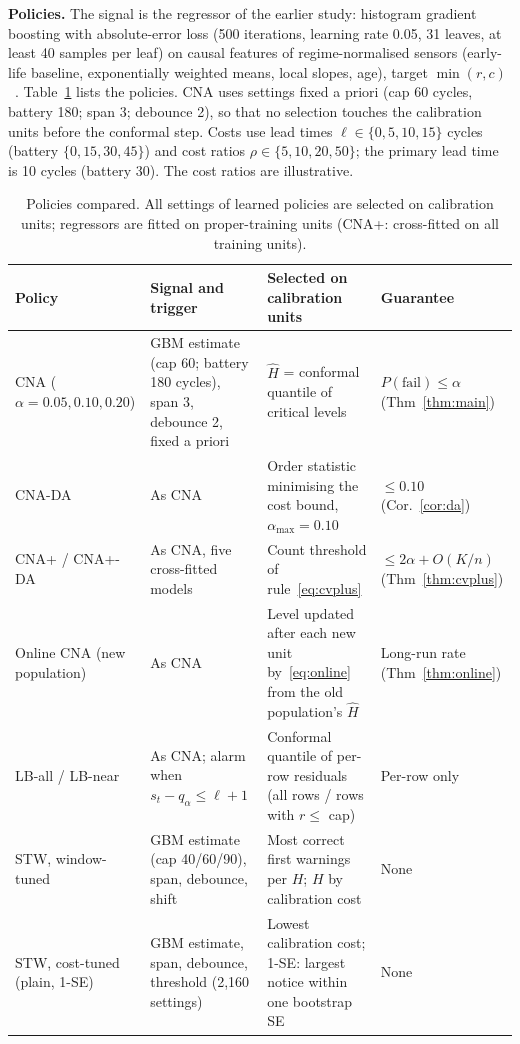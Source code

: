 \textbf{Policies.} The signal is the regressor of the earlier study: histogram gradient boosting with absolute-error loss (500 iterations, learning rate 0.05, 31 leaves, at least 40 samples per leaf) on causal features of regime-normalised sensors (early-life baseline, exponentially weighted means, local slopes, age), target $\min(r,c)$~\cite{pedregosa2011}. Table~\ref{tab:policies} lists the policies. CNA uses settings fixed a priori (cap 60 cycles, battery 180; span 3; debounce 2), so that no selection touches the calibration units before the conformal step. Costs use lead times $\ell\in\{0,5,10,15\}$ cycles (battery $\{0,15,30,45\}$) and cost ratios $\rho\in\{5,10,20,50\}$; the primary lead time is 10 cycles (battery 30). The cost ratios are illustrative.

\begin{table}[t]\footnotesize\setlength{\tabcolsep}{4pt}
\caption{Policies compared. All settings of learned policies are selected on calibration units; regressors are fitted on proper-training units (CNA+: cross-fitted on all training units).}\label{tab:policies}
\begin{tabular}{@{}p{}p{}p{}p{}@{}}
\toprule
Policy & Signal and trigger & Selected on calibration units & Guarantee \\
\midrule
CNA ($\alpha=0.05,0.10,0.20$) & GBM estimate (cap 60; battery 180 cycles), span 3, debounce 2, fixed a priori & $\hat H$ = conformal quantile of critical levels & $P(\text{fail})\le\alpha$ (Thm~\ref{thm:main}) \\
CNA-DA & As CNA & Order statistic minimising the cost bound, $\alpha_{\max}=0.10$ & $\le0.10$ (Cor.~\ref{cor:da}) \\
CNA+ / CNA+-DA & As CNA, five cross-fitted models & Count threshold of rule~\eqref{eq:cvplus} & $\le2\alpha+O(K/n)$ (Thm~\ref{thm:cvplus}) \\
Online CNA (new population) & As CNA & Level updated after each new unit by~\eqref{eq:online} from the old population's $\hat H$ & Long-run rate (Thm~\ref{thm:online}) \\
LB-all / LB-near & As CNA; alarm when $s_t-q_\alpha\le\ell+1$ & Conformal quantile of per-row residuals (all rows / rows with $r\le$ cap) & Per-row only \\
STW, window-tuned & GBM estimate (cap 40/60/90), span, debounce, shift & Most correct first warnings per $H$; $H$ by calibration cost & None \\
STW, cost-tuned (plain, 1-SE) & GBM estimate, span, debounce, threshold (2,160 settings) & Lowest calibration cost; 1-SE: largest notice within one bootstrap SE & None \\

\end{tabular}
\end{table}
